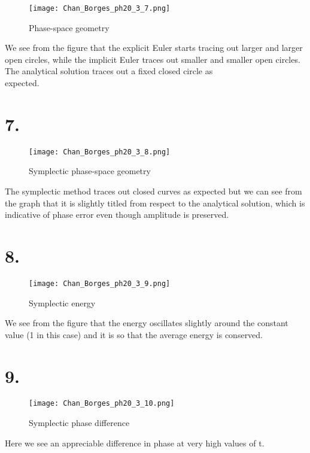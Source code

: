 \documentclass[12pt]{article}
\begin{document}
\begin{figure}[h]
\texttt{[image: Chan\_Borges\_ph20\_3\_7.png]}
\caption{Phase-space geometry}
\end{figure}

\noindent We see from the figure that the explicit Euler starts tracing out larger and larger open circles, while the implicit Euler traces out smaller and smaller open circles. The analytical solution traces out a fixed closed circle as \\ expected. 

\newpage

\section*{7.}

\begin{figure}[h]
\texttt{[image: Chan\_Borges\_ph20\_3\_8.png]}
\caption{Symplectic phase-space geometry}
\end{figure}

\noindent The symplectic method traces out closed curves as expected but we can see from the graph that it is slightly titled from respect to the analytical solution, which is indicative of phase error even though amplitude is preserved.

\newpage

\section*{8.}

\begin{figure}[h]
\texttt{[image: Chan\_Borges\_ph20\_3\_9.png]}
\caption{Symplectic energy}
\end{figure}

\noindent We see from the figure that the energy oscillates slightly around the constant value (1 in this case) and it is so that the average energy is conserved. 

\newpage

\section*{9.}
\begin{figure}[h]
\texttt{[image: Chan\_Borges\_ph20\_3\_10.png]}
\caption{Symplectic phase difference}
\end{figure}

Here we see an appreciable difference in phase at very high values of t. 
\end{document}
